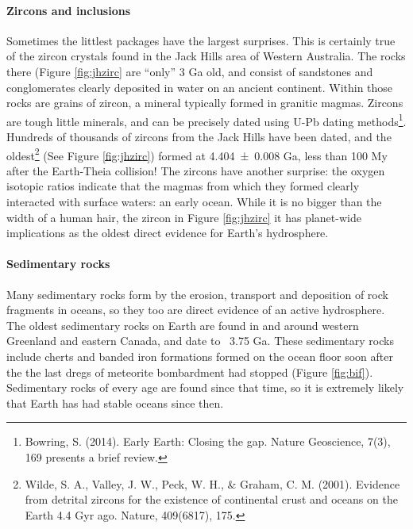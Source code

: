 \documentclass[amstex,12pt]{book}
\begin{document}
{\paragraph{Zircons and inclusions}
Sometimes the littlest packages have the largest surprises. This is certainly true of the zircon crystals found in the Jack Hills area of Western Australia. The rocks there (Figure \ref{fig:jhzirc} are ``only'' 3 Ga old, and consist of sandstones and conglomerates clearly deposited in water on an ancient continent. Within those rocks are grains of zircon, a mineral typically formed in granitic magmas. Zircons are tough little minerals, and can be precisely dated using U-Pb dating methods\footnote{Bowring, S. (2014). Early Earth: Closing the gap. Nature Geoscience, 7(3), 169 presents a brief review.}. Hundreds of thousands of zircons from the Jack Hills have been dated, and the oldest\footnote{Wilde, S. A., Valley, J. W., Peck, W. H., \& Graham, C. M. (2001). Evidence from detrital zircons for the existence of continental crust and oceans on the Earth 4.4 Gyr ago. Nature, 409(6817), 175.} (See Figure \ref{fig:jhzirc}) formed at \num[separate-uncertainty = true]{4.404(8)} Ga, less than 100 My after the Earth-Theia collision! The zircons have another surprise: the oxygen isotopic ratios indicate that the magmas from which they formed clearly interacted with surface waters: an early ocean. While it is no bigger than the width of a human hair, the zircon in Figure \ref{fig:jhzirc} it has planet-wide implications as the oldest direct evidence for Earth's hydrosphere.    
\paragraph{Sedimentary rocks}
Many sedimentary rocks form by the erosion, transport and deposition of rock fragments in oceans, so they too are direct evidence of an active hydrosphere. The oldest sedimentary rocks on Earth are found in and around western Greenland and eastern Canada, and date to ~3.75 Ga. These sedimentary rocks include cherts and banded iron formations formed on the ocean floor soon after the the last dregs of meteorite bombardment had stopped (Figure \ref{fig:bif}). Sedimentary rocks of every age are found since that time, so it is extremely likely that Earth has had stable oceans since then.

}
\end{document}
